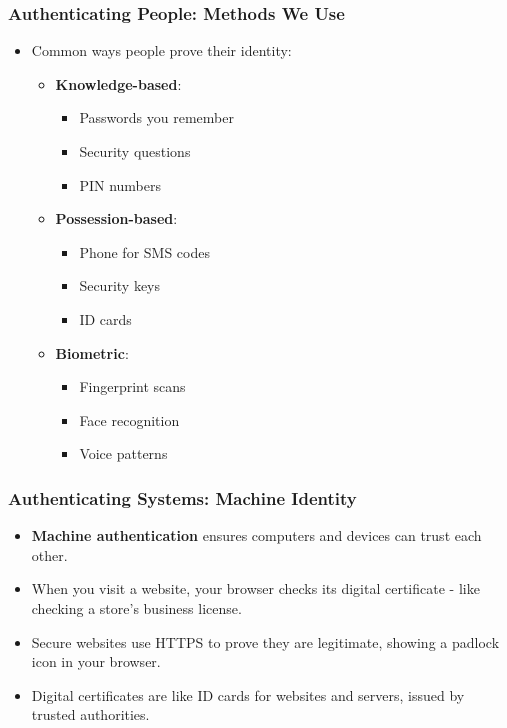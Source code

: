 \documentclass{beamer}
\begin{document}
\begin{frame}
    \frametitle{Authenticating People: Methods We Use}
    \begin{itemize}
        \item Common ways people prove their identity:
            \begin{itemize}
                \item \textbf{Knowledge-based}: 
                    \begin{itemize}
                        \item Passwords you remember
                        \item Security questions
                        \item PIN numbers
                    \end{itemize}
                \item \textbf{Possession-based}:
                    \begin{itemize}
                        \item Phone for SMS codes
                        \item Security keys
                        \item ID cards
                    \end{itemize}
                \item \textbf{Biometric}:
                    \begin{itemize}
                        \item Fingerprint scans
                        \item Face recognition
                        \item Voice patterns
                    \end{itemize}
            \end{itemize}
    \end{itemize}
\end{frame}

\begin{frame}
    \frametitle{Authenticating Systems: Machine Identity}
    \begin{itemize}
        \item \textbf{Machine authentication} ensures computers and devices can trust each other.
        \item When you visit a website, your browser checks its digital certificate - like checking a store's business license.
        \item Secure websites use HTTPS to prove they are legitimate, showing a padlock icon in your browser.
        \item Digital certificates are like ID cards for websites and servers, issued by trusted authorities.
    \end{itemize}
\end{frame}
\end{document}
